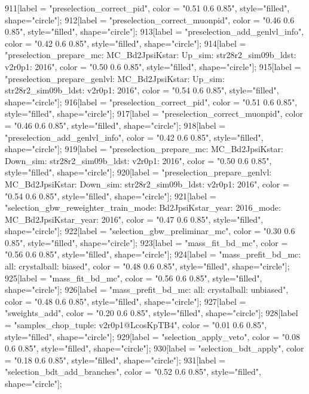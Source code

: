 {	911[label = "preselection_correct_pid", color = "0.51 0.6 0.85", style="filled", shape="circle"];
	912[label = "preselection_correct_muonpid", color = "0.46 0.6 0.85", style="filled", shape="circle"];
	913[label = "preselection_add_genlvl_info", color = "0.42 0.6 0.85", style="filled", shape="circle"];
	914[label = "preselection_prepare_mc\nmode: MC_Bd2JpsiKstar\npolarity: Up\nstrip_sim: str28r2_sim09b_ldst\nversion: v2r0p1\nyear: 2016", color = "0.50 0.6 0.85", style="filled", shape="circle"];
	915[label = "preselection_prepare_genlvl\nmode: MC_Bd2JpsiKstar\npolarity: Up\nstrip_sim: str28r2_sim09b_ldst\nversion: v2r0p1\nyear: 2016", color = "0.54 0.6 0.85", style="filled", shape="circle"];
	916[label = "preselection_correct_pid", color = "0.51 0.6 0.85", style="filled", shape="circle"];
	917[label = "preselection_correct_muonpid", color = "0.46 0.6 0.85", style="filled", shape="circle"];
	918[label = "preselection_add_genlvl_info", color = "0.42 0.6 0.85", style="filled", shape="circle"];
	919[label = "preselection_prepare_mc\nmode: MC_Bd2JpsiKstar\npolarity: Down\nstrip_sim: str28r2_sim09b_ldst\nversion: v2r0p1\nyear: 2016", color = "0.50 0.6 0.85", style="filled", shape="circle"];
	920[label = "preselection_prepare_genlvl\nmode: MC_Bd2JpsiKstar\npolarity: Down\nstrip_sim: str28r2_sim09b_ldst\nversion: v2r0p1\nyear: 2016", color = "0.54 0.6 0.85", style="filled", shape="circle"];
	921[label = "selection_gbw_reweighter_train\ndata_mode: Bd2JpsiKstar\ndata_year: 2016\nmc_mode: MC_Bd2JpsiKstar\nmc_year: 2016", color = "0.47 0.6 0.85", style="filled", shape="circle"];
	922[label = "selection_gbw_preliminar_mc", color = "0.30 0.6 0.85", style="filled", shape="circle"];
	923[label = "mass_fit_bd_mc", color = "0.56 0.6 0.85", style="filled", shape="circle"];
	924[label = "mass_prefit_bd_mc\nmassbin: all\nmassmodel: crystalball\ntrigger: biased", color = "0.48 0.6 0.85", style="filled", shape="circle"];
	925[label = "mass_fit_bd_mc", color = "0.56 0.6 0.85", style="filled", shape="circle"];
	926[label = "mass_prefit_bd_mc\nmassbin: all\nmassmodel: crystalball\ntrigger: unbiased", color = "0.48 0.6 0.85", style="filled", shape="circle"];
	927[label = "sweights_add", color = "0.20 0.6 0.85", style="filled", shape="circle"];
	928[label = "samples_chop_tuple\nversion: v2r0p1@LcosKpTB4", color = "0.01 0.6 0.85", style="filled", shape="circle"];
	929[label = "selection_apply_veto", color = "0.08 0.6 0.85", style="filled", shape="circle"];
	930[label = "selection_bdt_apply", color = "0.18 0.6 0.85", style="filled", shape="circle"];
	931[label = "selection_bdt_add_branches", color = "0.52 0.6 0.85", style="filled", shape="circle"];
}

